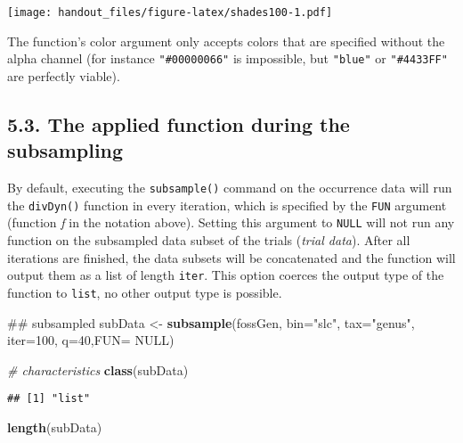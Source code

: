 \documentclass[]{article}
\newenvironment{Shaded}{\begin{snugshade}}{\end{snugshade}}
\newcommand{\KeywordTok}[1]{\textcolor[rgb]{0.13,0.29,0.53}{\textbf{{#1}}}}
\newcommand{\DataTypeTok}[1]{\textcolor[rgb]{0.13,0.29,0.53}{{#1}}}
\newcommand{\DecValTok}[1]{\textcolor[rgb]{0.00,0.00,0.81}{{#1}}}
\newcommand{\StringTok}[1]{\textcolor[rgb]{0.31,0.60,0.02}{{#1}}}
\newcommand{\CommentTok}[1]{\textcolor[rgb]{0.56,0.35,0.01}{\textit{{#1}}}}
\newcommand{\OtherTok}[1]{\textcolor[rgb]{0.56,0.35,0.01}{{#1}}}
\newcommand{\NormalTok}[1]{{#1}}
\begin{document}
\texttt{[image: handout\_files/figure-latex/shades100-1.pdf]}

The function's color argument only accepts colors that are specified
without the alpha channel (for instance \texttt{"\#00000066"} is
impossible, but \texttt{"blue"} or \texttt{"\#4433FF"} are perfectly
viable).

\subsection{5.3. The applied function during the
subsampling}\label{the-applied-function-during-the-subsampling}

By default, executing the \texttt{subsample()} command on the occurrence
data will run the \texttt{divDyn()} function in every iteration, which
is specified by the \texttt{FUN} argument (function \emph{f} in the
notation above). Setting this argument to \texttt{NULL} will not run any
function on the subsampled data subset of the trials (\emph{trial
data}). After all iterations are finished, the data subsets will be
concatenated and the function will output them as a list of length
\texttt{iter}. This option coerces the output type of the function to
\texttt{list}, no other output type is possible.

\begin{Shaded}
\begin{Highlighting}[]
\NormalTok{## subsampled }
\NormalTok{subData <-}\StringTok{ }\KeywordTok{subsample}\NormalTok{(fossGen, }\DataTypeTok{bin=}\StringTok{"slc"}\NormalTok{, }\DataTypeTok{tax=}\StringTok{"genus"}\NormalTok{, }
  \DataTypeTok{iter=}\DecValTok{100}\NormalTok{, }\DataTypeTok{q=}\DecValTok{40}\NormalTok{,}\DataTypeTok{FUN=} \OtherTok{NULL}\NormalTok{)}
\end{Highlighting}
\end{Shaded}

\begin{Shaded}
\begin{Highlighting}[]
\CommentTok{# characteristics}
\KeywordTok{class}\NormalTok{(subData)}
\end{Highlighting}
\end{Shaded}

\begin{verbatim}
## [1] "list"
\end{verbatim}

\begin{Shaded}
\begin{Highlighting}[]
\KeywordTok{length}\NormalTok{(subData)}
\end{Highlighting}
\end{Shaded}
\end{document}
